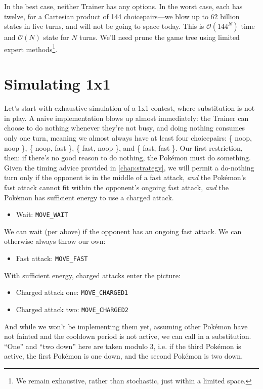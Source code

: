 In the best case, neither Trainer has any options.
In the worst case, each has twelve, for a Cartesian product of 144 choicepairs---we
  blow up to 62 billion states in five turns, and will not be going to space today.
This is $\mathcal{O}(144^N)$ time and $\mathcal{O}(N)$ state for $N$ turns.
We'll need prune the game tree using limited expert methods\footnote{We remain exhaustive, rather than
 stochastic, just within a limited space.}.

\section{Simulating 1x1}
\label{sec:simul1x1}
Let's start with exhaustive simulation of a 1x1 contest,
 where substitution is not in play.
A naive implementation blows up almost immediately: the Trainer can choose to do nothing
 whenever they're not busy, and doing nothing consumes only one turn,
 meaning we almost always have at least four choicepairs:
 \{ noop, noop \}, \{ noop, fast \}, \{ fast, noop \}, and \{ fast, fast \}.
Our first restriction, then: if there's no good reason to do nothing,
 the Pokémon must do something.
Given the timing advice provided in \autoref{chap:strategy}, we will permit
 a do-nothing turn only if the opponent is in the middle of a fast attack,
 \textit{and} the Pokémon's fast attack cannot fit within the opponent's ongoing fast attack,
 \textit{and} the Pokémon has sufficient energy to use a charged attack.
\begin{itemize}
\item Wait: \texttt{MOVE\_WAIT}
\end{itemize}
We can wait (per above) if the opponent has an ongoing fast attack.
We can otherwise always throw our own:
\begin{itemize}
\item Fast attack: \texttt{MOVE\_FAST}
\end{itemize}
With sufficient energy, charged attacks enter the picture:
\begin{itemize}
\item Charged attack one: \texttt{MOVE\_CHARGED1}
\item Charged attack two: \texttt{MOVE\_CHARGED2}
\end{itemize}
And while we won't be implementing them yet, assuming other Pokémon have not
  fainted and the cooldown period is not active, we can call in a substitution.
``One'' and ``two down'' here are taken modulo 3, i.e. if the third Pokémon is
  active, the first Pokémon is one down, and the second Pokémon is two down.

